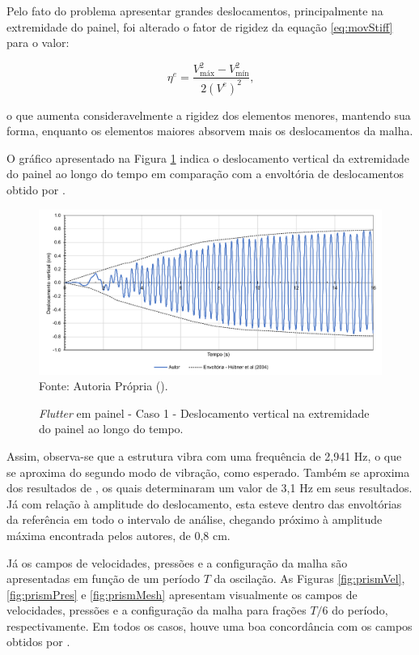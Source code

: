 Pelo fato do problema apresentar grandes deslocamentos, principalmente na extremidade do painel, foi alterado o fator de rigidez da equação \ref{eq:movStiff} para o valor:

\begin{equation}
    \eta^e=\frac{V_\mathrm{máx}^2-V_\mathrm{mín}^2}{2(V^e)^2}\text{,}
\end{equation}

\noindent o que aumenta consideravelmente a rigidez dos elementos menores, mantendo sua forma, enquanto os elementos maiores absorvem mais os deslocamentos da malha.

O gráfico apresentado na Figura \ref{fig:prismRes} indica o deslocamento vertical da extremidade do painel ao longo do tempo em comparação com a envoltória de deslocamentos obtido por .

\begin{figure}[h!]
    \centering
    \caption{\textit{Flutter} em painel - Caso 1 - Deslocamento vertical na extremidade do painel ao longo do tempo.}
    \includegraphics[width=\linewidth]{Figuras/FSI-prism/resultados.pdf}
    \\Fonte: Autoria Própria (\the\year).
    \label{fig:prismRes}
\end{figure}

Assim, observa-se que a estrutura vibra com uma frequência de 2,941 Hz, o que se aproxima do segundo modo de vibração, como esperado. Também se aproxima dos resultados de , os quais determinaram um valor de 3,1 Hz em seus resultados. Já com relação à amplitude do deslocamento, esta esteve dentro das envoltórias da referência em todo o intervalo de análise, chegando próximo à amplitude máxima encontrada pelos autores, de 0,8 cm.

Já os campos de velocidades, pressões e a configuração da malha são apresentadas em função de um período $T$ da oscilação. As Figuras \ref{fig:prismVel}, \ref{fig:prismPres} e \ref{fig:prismMesh} apresentam visualmente os campos de velocidades, pressões e a configuração da malha para frações $T/6$ do período, respectivamente. Em todos os casos, houve uma boa concordância com os campos obtidos por .

